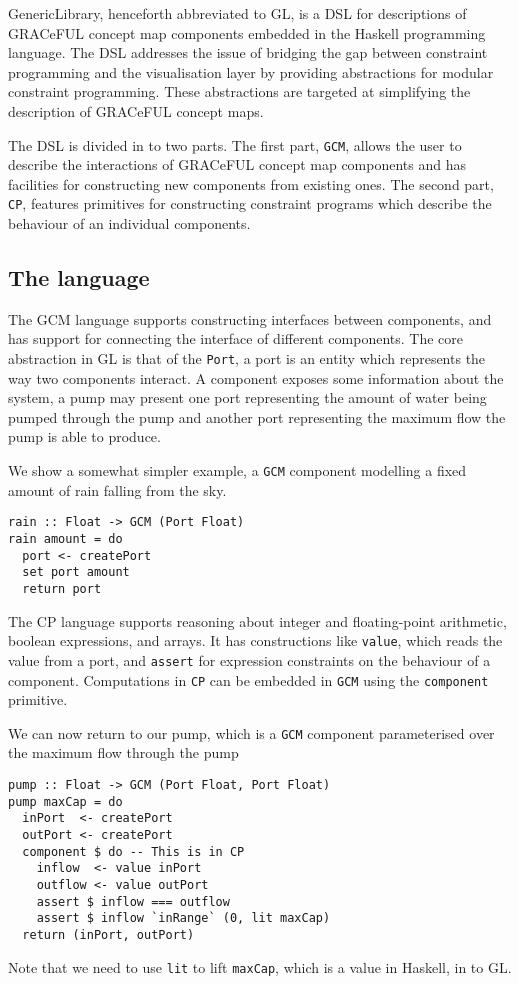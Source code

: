 GenericLibrary, henceforth abbreviated to GL, is a DSL for descriptions
of GRACeFUL concept map components embedded in the Haskell programming language.
The DSL addresses the issue of bridging the gap between constraint programming
and the visualisation layer by providing abstractions for modular constraint programming.
These abstractions are targeted at simplifying the description of GRACeFUL concept maps.

The DSL is divided in to two parts. The first part, \texttt{GCM},
allows the user to describe the interactions of GRACeFUL concept map components
and has facilities for constructing new components from existing ones. The second part,
\texttt{CP}, features primitives for constructing constraint programs
which describe the behaviour of an individual components.

\subsection{The language}
The GCM language supports constructing interfaces between components,
and has support for connecting the interface of different components.
The core abstraction in GL is that of the \texttt{Port}, a port is an
entity which represents the way two components interact. A component
exposes some information about the system, a pump may present one port
representing the amount of water being pumped through the pump and another
port representing the maximum flow the pump is able to produce.

We show a somewhat simpler example, a \texttt{GCM} component modelling
a fixed amount of rain falling from the sky.
\begin{verbatim}
rain :: Float -> GCM (Port Float)
rain amount = do
  port <- createPort
  set port amount
  return port
\end{verbatim}

The CP language supports reasoning about integer and floating-point arithmetic, boolean expressions,
and arrays. It has constructions like \texttt{value}, which reads the value from a port, and \texttt{assert} for
expression constraints on the behaviour of a component. Computations in \texttt{CP} can be
embedded in \texttt{GCM} using the \texttt{component} primitive.

We can now return to our pump, which is a \texttt{GCM} component parameterised over the maximum
flow through the pump
\begin{verbatim}
pump :: Float -> GCM (Port Float, Port Float)
pump maxCap = do
  inPort  <- createPort
  outPort <- createPort
  component $ do -- This is in CP
    inflow  <- value inPort
    outflow <- value outPort
    assert $ inflow === outflow
    assert $ inflow `inRange` (0, lit maxCap)
  return (inPort, outPort)
\end{verbatim}
Note that we need to use \texttt{lit} to lift \texttt{maxCap}, which is a value in Haskell,
in to GL.

